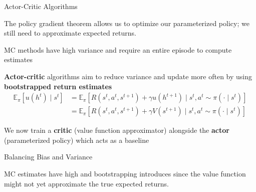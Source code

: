 \begin{frame}{Actor-Critic Algorithms}

The policy gradient theorem allows us to optimize our parameterized policy; we still need to approximate expected returns. 

\blist
    \item MC methods have high variance and require an entire episode to compute estimates
    \item \textbf{Actor-critic} algorithms aim to reduce variance and update more often by using  \textbf{bootstrapped return estimates}
\elist
\vspace{-.5cm}
\begin{align*}
\mathbb{E}_{\pi} \left[ u(h^{t}) \mid s^{t} \right] &= \mathbb{E}_{\pi} \left[ R(s^{t}, a^{t}, s^{t+1}) + \gamma u(h^{t+1}) \mid s^{t}, a^{t} \sim \pi( \cdot \mid s^{t}) \right] \\
&= \mathbb{E}_{\pi} \left[ R(s^{t}, a^{t}, s^{t+1}) + \gamma V(s^{t+1}) \mid s^{t}, a^{t} \sim \pi( \cdot  \mid s^{t}) \right]    
\end{align*}

\blist
    \item We now train a \textbf{critic} (value function approximator) alongside the \textbf{actor} (parameterized policy) which acts as a baseline
\elist

\end{frame}

\begin{frame}[t]{Balancing Bias and Variance}
\vspace{-1em}

\begin{problembox}
    MC estimates have high  and bootstrapping introduces  since the value function might not yet approximate the true expected returns.
\end{problembox}

\end{frame}

